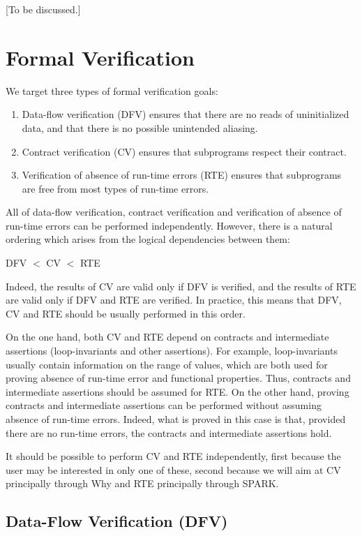 \documentclass[fullpage]{article}
\newcounter{example}
\begin{document}
[To be discussed.]

\section{Formal Verification}
\label{sec:formal-verification}

We target three types of formal verification goals:
\begin{enumerate}
\item Data-flow verification (DFV) ensures that there are no reads of
  uninitialized data, and that there is no possible unintended aliasing.
\item Contract verification (CV) ensures that subprograms respect their
  contract.
\item Verification of absence of run-time errors (RTE) ensures that subprograms
  are free from most types of run-time errors.
\end{enumerate}

All of data-flow verification, contract verification and verification of
absence of run-time errors can be performed independently. However, there is a
natural ordering which arises from the logical dependencies between them: 
\begin{center}
  DFV $<$ CV $<$ RTE
\end{center}

Indeed, the results of CV are valid only if DFV is verified, and the results of
RTE are valid only if DFV and RTE are verified. In practice, this means that
DFV, CV and RTE should be usually performed in this order.

On the one hand, both CV and RTE depend on contracts and intermediate
assertions (loop-invariants and other assertions). For example, loop-invariants
usually contain information on the range of values, which are both used for
proving absence of run-time error and functional properties. Thus, contracts
and intermediate assertions should be assumed for RTE. On the other hand,
proving contracts and intermediate assertions can be performed without assuming
absence of run-time errors. Indeed, what is proved in this case is that,
provided there are no run-time errors, the contracts and intermediate
assertions hold.

It should be possible to perform CV and RTE independently, first because the
user may be interested in only one of these, second because we will aim at CV
principally through Why and RTE principally through SPARK.

\subsection{Data-Flow Verification (DFV)}
\label{sub:DFV}
\end{document}
